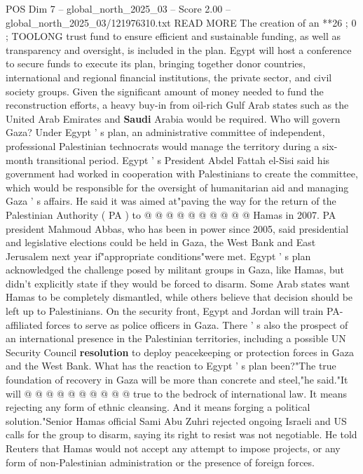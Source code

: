 \begin{textsample}{POS Dim 7 – global\_north\_2025\_03 – Score 2.00 – global\_north\_2025\_03/121976310.txt}  \label{ex:f7_pos_323}
READ MORE The creation of an **26 ; 0 ; TOOLONG trust fund to ensure efficient and sustainable funding, as well as transparency and oversight, is included in the plan.
Egypt will host a conference to secure funds to execute its plan, bringing together donor countries, international and regional financial institutions, the private sector, and civil society groups.
Given the significant amount of money needed to fund the reconstruction efforts, a heavy buy-in from oil-rich Gulf Arab states such as the United Arab Emirates and \textbf{Saudi} Arabia would be required.
Who will govern Gaza?
Under Egypt ' s plan, an administrative committee of independent, professional Palestinian technocrats would manage the territory during a six-month transitional period.
Egypt ' s President Abdel Fattah el-Sisi said his government had worked in cooperation with Palestinians to create the committee, which would be responsible for the oversight of humanitarian aid and managing Gaza ' s affairs.
He said it was aimed at"paving the way for the return of the Palestinian Authority ( PA ) to @ @ @ @ @ @ @ @ @ @ Hamas in 2007.
PA president Mahmoud Abbas, who has been in power since 2005, said presidential and legislative elections could be held in Gaza, the West Bank and East Jerusalem next year if"appropriate conditions"were met.
Egypt ' s plan acknowledged the challenge posed by militant groups in Gaza, like Hamas, but didn't explicitly state if they would be forced to disarm.
Some Arab states want Hamas to be completely dismantled, while others believe that decision should be left up to Palestinians.
On the security front, Egypt and Jordan will train PA-affiliated forces to serve as police officers in Gaza.
There ' s also the prospect of an international presence in the Palestinian territories, including a possible UN Security Council \textbf{resolution} to deploy peacekeeping or protection forces in Gaza and the West Bank.
What has the reaction to Egypt ' s plan been?"The true foundation of recovery in Gaza will be more than concrete and steel,"he said."It will @ @ @ @ @ @ @ @ @ @ true to the bedrock of international law.
It means rejecting any form of ethnic cleansing.
And it means forging a political solution."Senior Hamas official Sami Abu Zuhri rejected ongoing Israeli and US calls for the group to disarm, saying its right to resist was not negotiable.
He told Reuters that Hamas would not accept any attempt to impose projects, or any form of non-Palestinian administration or the presence of foreign forces.

\end{textsample}
